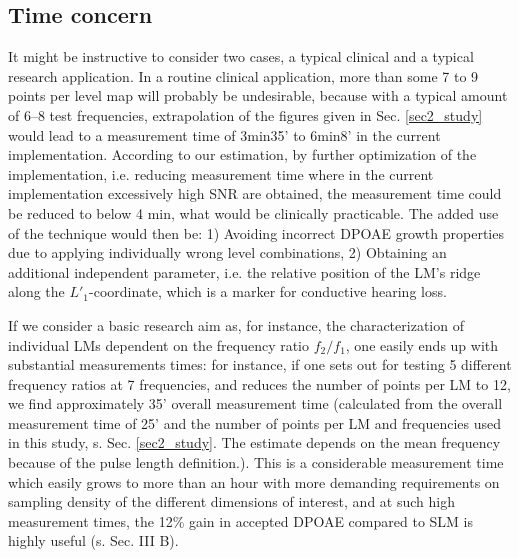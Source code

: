 \documentclass[journal,twoside,web]{ieeecolor2}
\begin{document}
\subsection{Time concern}
It might be instructive to consider two cases, a typical clinical and a typical research application.
In a routine clinical application, more than some 7 to 9 points per level map will probably be undesirable, because with a typical amount of 6–8 test frequencies, extrapolation of the figures given in Sec. \ref{sec2_study} would lead to a measurement time of 3min35' to 6min8' in the current implementation.
According to our estimation, by further optimization of the implementation, i.e. reducing measurement time where in the current implementation excessively high SNR are obtained, the measurement time could be reduced to below 4 min, what would be clinically practicable.
The added use of the technique would then be: 1) Avoiding incorrect DPOAE growth properties due to applying individually wrong level combinations, 2) Obtaining an additional independent parameter, i.e. the relative position of the LM's ridge along the $L'_1$-coordinate, which is a marker for conductive hearing loss.

If we consider a basic research aim as, for instance, the characterization of individual LMs dependent on the frequency ratio $f_2/f_1$, one easily ends up with substantial measurements times: for instance, if one sets out for testing 5 different frequency ratios at 7 frequencies, and reduces the number of points per LM to 12, we find approximately 35' overall measurement time (calculated from the overall measurement time of 25' and the number of points per LM and frequencies used in this study, s. Sec. \ref{sec2_study}.
The estimate depends on the mean frequency because of the pulse length definition.).
This is a considerable measurement time which easily grows to more than an hour with more demanding requirements on sampling density of the different dimensions of interest, and at such high measurement times, the 12\% gain in accepted DPOAE compared to SLM is highly useful (s. Sec. III B).
\end{document}
